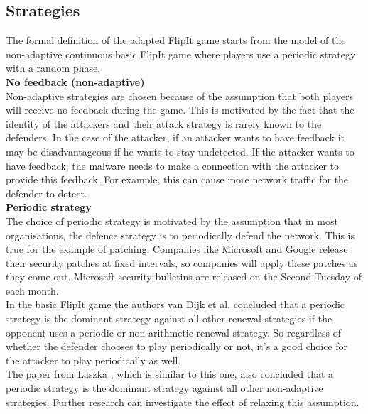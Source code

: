 \subsection{Strategies}
The formal definition of the adapted FlipIt game starts from the model of the non-adaptive continuous basic FlipIt game where players use a periodic strategy with a random phase. \\

\textbf{No feedback (non-adaptive)}\\
Non-adaptive strategies are chosen because of the assumption that both players will receive no feedback during the game. This is motivated by the fact that the identity of the attackers and their attack strategy is rarely known to the defenders. In the case of the attacker, if an attacker wants to have feedback it may be disadvantageous if he wants to stay undetected. If the attacker wants to have feedback, the malware needs to make a connection with the attacker to provide this feedback. For example, this can cause more network traffic for the defender to detect. \\

\textbf{Periodic strategy}\\
The choice of periodic strategy is motivated by the assumption that in most organisations, the defence strategy is to periodically defend the network.  This is true for the example of patching. Companies like Microsoft and Google release their security patches at fixed intervals, so companies will apply these patches as they come out. Microsoft security bulletins are released on the Second Tuesday of each month. \cite{MicroPatch} \\

In the basic FlipIt game \citep{FlipIt} the authors van Dijk et al. concluded that a periodic strategy is the dominant strategy against all other renewal strategies if the opponent uses a periodic or non-arithmetic renewal strategy.  So regardless of whether the defender chooses to play periodically or not, it's a good choice for the attacker to play periodically as well. \\

The paper from Laszka \citep{MitigationNonTargeted}, which is similar to this one, also concluded that a periodic strategy is the dominant strategy against all other non-adaptive strategies.
Further research can investigate the effect of relaxing this assumption. \\

